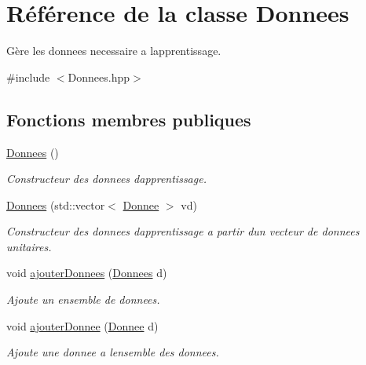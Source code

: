 \hypertarget{class_donnees}{}\section{Référence de la classe Donnees}
\label{class_donnees}


Gère les donnees necessaire a l\textquotesingle{}apprentissage.  




{\ttfamily \#include $<$Donnees.\+hpp$>$}

\subsection*{Fonctions membres publiques}
\begin{DoxyCompactItemize}
\item 
\mbox{\label{class_donnees_af6379b2712677e845cf58e37000f9b75}} 
\hyperlink{class_donnees_af6379b2712677e845cf58e37000f9b75}{Donnees} ()
\begin{DoxyCompactList}\small\item\em Constructeur des donnees d\textquotesingle{}apprentissage. \end{DoxyCompactList}\item 
\mbox{\label{class_donnees_aab4dadccfdee90d79faedaa42a3200b8}} 
\hyperlink{class_donnees_aab4dadccfdee90d79faedaa42a3200b8}{Donnees} (std\+::vector$<$ \hyperlink{class_donnee}{Donnee} $>$ vd)
\begin{DoxyCompactList}\small\item\em Constructeur des donnees d\textquotesingle{}apprentissage a partir d\textquotesingle{}un vecteur de donnees unitaires. \end{DoxyCompactList}\item 
void \hyperlink{class_donnees_a26d282aff1a7adfdcaea1a3cab6ffbaf}{ajouter\+Donnees} (\hyperlink{class_donnees}{Donnees} d)
\begin{DoxyCompactList}\small\item\em Ajoute un ensemble de donnees. \end{DoxyCompactList}\item 
void \hyperlink{class_donnees_a7f77ebe53ea55a3293cefb864d60e7ff}{ajouter\+Donnee} (\hyperlink{class_donnee}{Donnee} d)
\begin{DoxyCompactList}\small\item\em Ajoute une donnee a l\textquotesingle{}ensemble des donnees. \end{DoxyCompactList}\item 

\end{DoxyCompactItemize}
